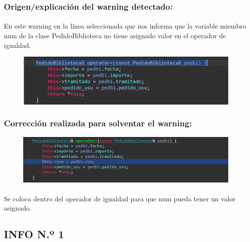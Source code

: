 		\subsubsection{Origen/explicación del warning detectado:}
		
			\paragraph{}En este warning en la línea seleccionada que nos informa que la variable miembro num de la clase PedidoBiblioteca no tiene asignado valor en el operador de igualdad.
			
			\begin{figure}[H]
				\centering
				\includegraphics[scale=0.55]{img/esteban8.png}
				\label{esteban8}
			\end{figure}
		
		\subsubsection{Corrección realizada para solventar el warning:}
		
			\begin{figure}[H]
				\centering
				\includegraphics[scale=0.55]{img/esteban9.png}
				\label{esteban9}
			\end{figure}
		
			\paragraph{}Se coloca dentro del operador de igualdad para que num pueda tener un valor asignado.
			
	\subsection{INFO N.º 1}
	
